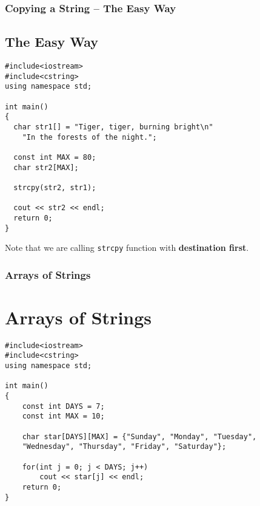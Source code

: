 \documentclass{beamer}
\begin{document}
\begin{frame}[fragile]\frametitle{Copying a String -- The Easy Way}
    \subsection{The Easy Way} %
    \label{sub:the_easy_way}
    \lstset{style=mystyle}
\begin{lstlisting}
#include<iostream>
#include<cstring>
using namespace std;

int main()
{
  char str1[] = "Tiger, tiger, burning bright\n"
    "In the forests of the night.";

  const int MAX = 80;
  char str2[MAX];

  strcpy(str2, str1);

  cout << str2 << endl;
  return 0;
}
\end{lstlisting}
    Note that we are calling \texttt{strcpy} function with \textbf{destination first}.
\end{frame}

\begin{frame}[fragile]\frametitle{Arrays of Strings}
    \section{Arrays of Strings} %
    \label{sec:arrays_of_strings}
    \lstset{style=mystyle}
\begin{lstlisting}
#include<iostream>
#include<cstring>
using namespace std;

int main()
{
    const int DAYS = 7;
    const int MAX = 10;

    char star[DAYS][MAX] = {"Sunday", "Monday", "Tuesday",
    "Wednesday", "Thursday", "Friday", "Saturday"};

    for(int j = 0; j < DAYS; j++)
        cout << star[j] << endl;
    return 0;
}
\end{lstlisting}
\end{frame}
\end{document}
